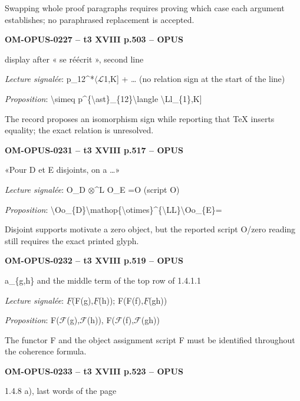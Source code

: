 Swapping whole proof paragraphs requires proving which case each argument establishes; no paraphrased replacement is accepted.\par
\par\noindent\textbf{OM-OPUS-0227 -- t3 XVIII p.503 -- OPUS}\par
display after « se réécrit », second line\par
\emph{Lecture signalée}: p\_12\textasciicircum{}*\ensuremath{\langle}\ensuremath{\mathcal{L}}1,K] + … (no relation sign at the start of the line)\par
\emph{Proposition}: \textbackslash{}simeq p\textasciicircum{}\{\textbackslash{}ast\}\_\{12\}\textbackslash{}langle \textbackslash{}Ll\_\{1\},K]\par
The record proposes an isomorphism sign while reporting that TeX inserts equality; the exact relation is unresolved.\par
\par\noindent\textbf{OM-OPUS-0231 -- t3 XVIII p.517 -- OPUS}\par
«Pour D et E disjoints, on a …»\par
\emph{Lecture signalée}: O\_D \ensuremath{\otimes}\textasciicircum{}L O\_E =\allowbreak  O (script O)\par
\emph{Proposition}: \textbackslash{}Oo\_\{D\}\textbackslash{}mathop\{\textbackslash{}otimes\}\textasciicircum{}\{\textbackslash{}LL\}\textbackslash{}Oo\_\{E\}=\par
Disjoint supports motivate a zero object, but the reported script O/zero reading still requires the exact printed glyph.\par
\par\noindent\textbf{OM-OPUS-0232 -- t3 XVIII p.519 -- OPUS}\par
a\_\{g,h\} and the middle term of the top row of 1.4.1.1\par
\emph{Lecture signalée}: \ensuremath{\underline{F}}(F(g),\ensuremath{\underline{F}}(h)); F(F(f),\ensuremath{\underline{F}}(gh))\par
\emph{Proposition}: F(\ensuremath{\mathcal{F}}(g),\ensuremath{\mathcal{F}}(h)), F(\ensuremath{\mathcal{F}}(f),\ensuremath{\mathcal{F}}(gh))\par
The functor F and the object assignment script F must be identified throughout the coherence formula.\par
\par\noindent\textbf{OM-OPUS-0233 -- t3 XVIII p.523 -- OPUS}\par
1.4.8 a), last words of the page\par

